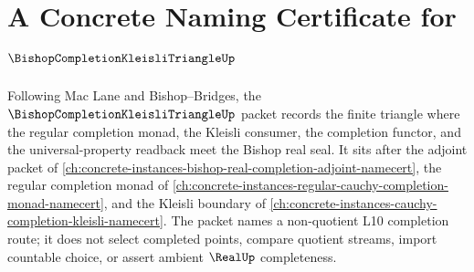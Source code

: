 \chapter{A Concrete Naming Certificate for $\BishopCompletionKleisliTriangleUp$}
\label{ch:concrete-instances-bishop-completion-kleisli-triangle-namecert}

Following Mac Lane and Bishop--Bridges, the $\BishopCompletionKleisliTriangleUp$ packet records the finite triangle where the regular completion monad, the Kleisli consumer, the completion functor, and the universal-property readback meet the Bishop real seal. It sits after the adjoint packet of \autoref{ch:concrete-instances-bishop-real-completion-adjoint-namecert}, the regular completion monad of \autoref{ch:concrete-instances-regular-cauchy-completion-monad-namecert}, and the Kleisli boundary of \autoref{ch:concrete-instances-cauchy-completion-kleisli-namecert}. The packet names a non-quotient L10 completion route; it does not select completed points, compare quotient streams, import countable choice, or assert ambient $\RealUp$ completeness.

